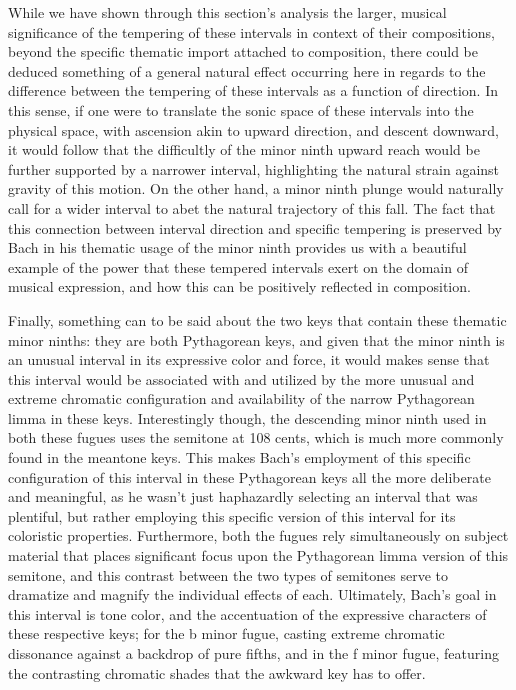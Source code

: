     \begin{center}
    \end{center}
    
    While we have shown through this section's analysis the larger, musical
significance of the tempering of these intervals in context of their
compositions, beyond the specific thematic import attached to
composition, there could be deduced something of a general natural
effect occurring here in regards to the difference between the tempering
of these intervals as a function of direction. In this sense, if one
were to translate the sonic space of these intervals into the physical
space, with ascension akin to upward direction, and descent downward, it
would follow that the difficultly of the minor ninth upward reach would
be further supported by a narrower interval, highlighting the natural
strain against gravity of this motion. On the other hand, a minor ninth
plunge would naturally call for a wider interval to abet the natural
trajectory of this fall. The fact that this connection between interval
direction and specific tempering is preserved by Bach in his thematic
usage of the minor ninth provides us with a beautiful example of the
power that these tempered intervals exert on the domain of musical
expression, and how this can be positively reflected in composition.

Finally, something can to be said about the two keys that contain these
thematic minor ninths: they are both Pythagorean keys, and given that
the minor ninth is an unusual interval in its expressive color and
force, it would makes sense that this interval would be associated with
and utilized by the more unusual and extreme chromatic configuration and
availability of the narrow Pythagorean limma in these keys.
Interestingly though, the descending minor ninth used in both these
fugues uses the semitone at 108 cents, which is much more commonly found
in the meantone keys. This makes Bach's employment of this specific
configuration of this interval in these Pythagorean keys all the more
deliberate and meaningful, as he wasn't just haphazardly selecting an
interval that was plentiful, but rather employing this specific version
of this interval for its coloristic properties. Furthermore, both the
fugues rely simultaneously on subject material that places significant
focus upon the Pythagorean limma version of this semitone, and this
contrast between the two types of semitones serve to dramatize and
magnify the individual effects of each. Ultimately, Bach's goal in this
interval is tone color, and the accentuation of the expressive
characters of these respective keys; for the b minor fugue, casting
extreme chromatic dissonance against a backdrop of pure fifths, and in
the f minor fugue, featuring the contrasting chromatic shades that the
awkward key has to offer.

